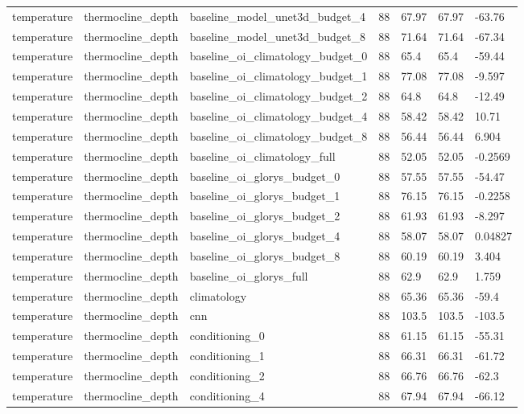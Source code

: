 \begin{table}[htbp]
\begin{tabular}{lllllll}
temperature & thermocline\_depth & baseline\_model\_unet3d\_budget\_4 & 88 & 67.97 & 67.97 & -63.76 \\
temperature & thermocline\_depth & baseline\_model\_unet3d\_budget\_8 & 88 & 71.64 & 71.64 & -67.34 \\
temperature & thermocline\_depth & baseline\_oi\_climatology\_budget\_0 & 88 & 65.4 & 65.4 & -59.44 \\
temperature & thermocline\_depth & baseline\_oi\_climatology\_budget\_1 & 88 & 77.08 & 77.08 & -9.597 \\
temperature & thermocline\_depth & baseline\_oi\_climatology\_budget\_2 & 88 & 64.8 & 64.8 & -12.49 \\
temperature & thermocline\_depth & baseline\_oi\_climatology\_budget\_4 & 88 & 58.42 & 58.42 & 10.71 \\
temperature & thermocline\_depth & baseline\_oi\_climatology\_budget\_8 & 88 & 56.44 & 56.44 & 6.904 \\
temperature & thermocline\_depth & baseline\_oi\_climatology\_full & 88 & 52.05 & 52.05 & -0.2569 \\
temperature & thermocline\_depth & baseline\_oi\_glorys\_budget\_0 & 88 & 57.55 & 57.55 & -54.47 \\
temperature & thermocline\_depth & baseline\_oi\_glorys\_budget\_1 & 88 & 76.15 & 76.15 & -0.2258 \\
temperature & thermocline\_depth & baseline\_oi\_glorys\_budget\_2 & 88 & 61.93 & 61.93 & -8.297 \\
temperature & thermocline\_depth & baseline\_oi\_glorys\_budget\_4 & 88 & 58.07 & 58.07 & 0.04827 \\
temperature & thermocline\_depth & baseline\_oi\_glorys\_budget\_8 & 88 & 60.19 & 60.19 & 3.404 \\
temperature & thermocline\_depth & baseline\_oi\_glorys\_full & 88 & 62.9 & 62.9 & 1.759 \\
temperature & thermocline\_depth & climatology & 88 & 65.36 & 65.36 & -59.4 \\
temperature & thermocline\_depth & cnn & 88 & 103.5 & 103.5 & -103.5 \\
temperature & thermocline\_depth & conditioning\_0 & 88 & 61.15 & 61.15 & -55.31 \\
temperature & thermocline\_depth & conditioning\_1 & 88 & 66.31 & 66.31 & -61.72 \\
temperature & thermocline\_depth & conditioning\_2 & 88 & 66.76 & 66.76 & -62.3 \\
temperature & thermocline\_depth & conditioning\_4 & 88 & 67.94 & 67.94 & -66.12 \\

\end{tabular}
\end{table}
